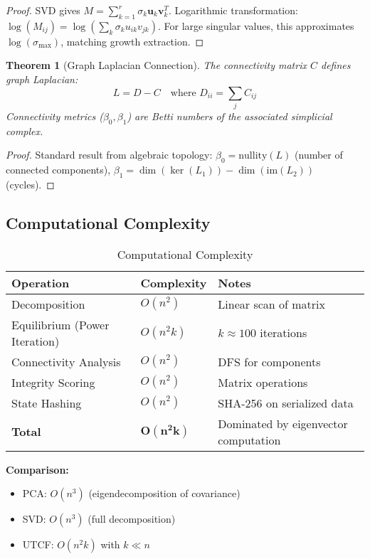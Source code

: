 \documentclass[11pt,a4paper]{article}
\newtheorem{theorem}{Theorem}[section]
\theoremstyle{definition}
\theoremstyle{remark}
\begin{document}
\begin{proof}
SVD gives $M = \sum_{k=1}^r \sigma_k \mathbf{u}_k \mathbf{v}_k^T$. Logarithmic transformation: $\log(M_{ij}) = \log(\sum_k \sigma_k u_{ik} v_{jk})$. For large singular values, this approximates $\log(\sigma_{\max})$, matching growth extraction.
\end{proof}

\begin{theorem}[Graph Laplacian Connection]\label{thm:laplacian}
The connectivity matrix $C$ defines graph Laplacian:
\begin{equation}
L = D - C \quad \text{where } D_{ii} = \sum_j C_{ij}
\end{equation}
Connectivity metrics ($\beta_0, \beta_1$) are Betti numbers of the associated simplicial complex.
\end{theorem}

\begin{proof}
Standard result from algebraic topology: $\beta_0 = \text{nullity}(L)$ (number of connected components), $\beta_1 = \dim(\ker(L_1)) - \dim(\text{im}(L_2))$ (cycles).
\end{proof}

\subsection{Computational Complexity}

\begin{table}[h]
\centering
\begin{tabular}{lll}
\toprule
\textbf{Operation} & \textbf{Complexity} & \textbf{Notes} \\
\midrule
Decomposition & $O(n^2)$ & Linear scan of matrix \\
Equilibrium (Power Iteration) & $O(n^2 k)$ & $k \approx 100$ iterations \\
Connectivity Analysis & $O(n^2)$ & DFS for components \\
Integrity Scoring & $O(n^2)$ & Matrix operations \\
State Hashing & $O(n^2)$ & SHA-256 on serialized data \\
\midrule
\textbf{Total} & $\mathbf{O(n^2 k)}$ & Dominated by eigenvector computation \\
\bottomrule
\end{tabular}
\caption{Computational Complexity}
\label{tab:complexity}
\end{table}

\textbf{Comparison:}
\begin{itemize}
\item PCA: $O(n^3)$ (eigendecomposition of covariance)
\item SVD: $O(n^3)$ (full decomposition)
\item UTCF: $O(n^2 k)$ with $k \ll n$
\end{itemize}
\end{document}
